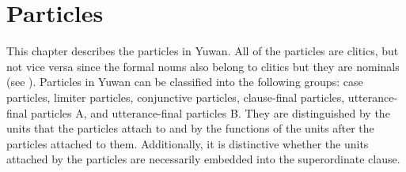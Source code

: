 \chapter{Particles}\label{chap:10}

This chapter describes the particles in Yuwan. All of the particles are clitics, but not vice versa since the formal nouns also belong to clitics but they are nominals (see ). Particles in Yuwan can be classified into the following groups: case particles, limiter particles, conjunctive particles, clause-final particles, utterance-final particles A, and utterance-final particles B. They are distinguished by the units that the particles attach to and by the functions of the units after the particles attached to them. Additionally, it is distinctive whether the units attached by the particles are necessarily embedded into the superordinate clause.

\begin{sidewaystable}
\caption{Particles in Yuwan. “VPP” indicates the verbal predicate phrase; “Adv.” indicates the adverbial clause; “+/\textminus” means that some particles or some clauses cannot satisfy the criteria.\label{tab:96}
}
\end{sidewaystable}


